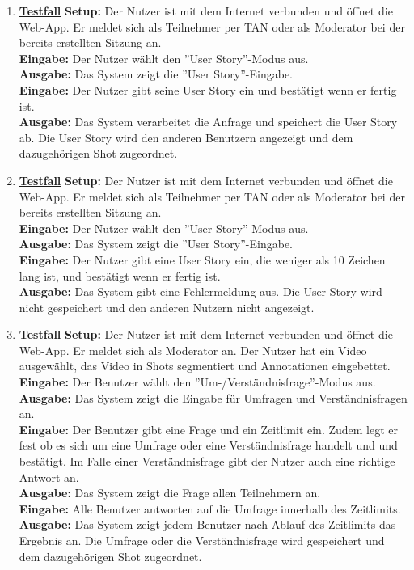 \begin{enumerate}
	\item \underline{\textbf{Testfall}} \linebreak
	\textbf{Setup:} Der Nutzer ist mit dem Internet verbunden und öffnet die Web-App. Er meldet sich als Teilnehmer per TAN oder als Moderator bei der bereits erstellten Sitzung an.\\
	\textbf{Eingabe:} Der Nutzer wählt den ''User Story''-Modus aus. \\
	\textbf{Ausgabe:} Das System zeigt die ''User Story''-Eingabe. \\
	\textbf{Eingabe:} Der Nutzer gibt seine User Story ein und bestätigt wenn er fertig ist.\\
	\textbf{Ausgabe:} Das System verarbeitet die Anfrage und speichert die User Story ab. Die User Story wird den anderen Benutzern angezeigt und dem dazugehörigen Shot zugeordnet. \\
	
	\item \underline{\textbf{Testfall}} \linebreak
	\textbf{Setup:} Der Nutzer ist mit dem Internet verbunden und öffnet die Web-App. Er meldet sich als Teilnehmer per TAN oder als Moderator bei der bereits erstellten Sitzung an. \\
	\textbf{Eingabe:} Der Nutzer wählt den ''User Story''-Modus aus. \\ 
	\textbf{Ausgabe:} Das System zeigt die ''User Story''-Eingabe. \\
	\textbf{Eingabe:} Der Nutzer gibt eine User Story ein, die weniger als 10 Zeichen lang ist, und bestätigt wenn er fertig ist. \\
	\textbf{Ausgabe:} Das System gibt eine Fehlermeldung aus. Die User Story wird nicht gespeichert und den anderen Nutzern nicht angezeigt. \\
	
	
	\item \underline{\textbf{Testfall}} \linebreak
	\textbf{Setup:} Der Nutzer ist mit dem Internet verbunden und öffnet die Web-App. Er meldet sich als Moderator an. Der Nutzer hat ein Video ausgewählt, das Video in Shots segmentiert und Annotationen eingebettet. \\
	\textbf{Eingabe:} Der Benutzer wählt den ''Um-/Verständnisfrage''-Modus aus. \\
	\textbf{Ausgabe:} Das System zeigt die Eingabe für Umfragen und Verständnisfragen an.\\ 
	\textbf{Eingabe:} Der Benutzer gibt eine Frage und ein Zeitlimit ein. Zudem legt er fest ob es sich um eine Umfrage oder eine Verständnisfrage handelt und und bestätigt. Im Falle einer Verständnisfrage gibt der Nutzer auch eine richtige Antwort an.\\
	\textbf{Ausgabe:} Das System zeigt die Frage allen Teilnehmern an.\\ 
	\textbf{Eingabe:} Alle Benutzer antworten auf die Umfrage innerhalb des Zeitlimits.\\
	\textbf{Ausgabe:} Das System zeigt jedem Benutzer nach Ablauf des Zeitlimits das Ergebnis an. Die Umfrage oder die Verständnisfrage wird gespeichert und dem dazugehörigen Shot zugeordnet.\\
	

\end{enumerate}
